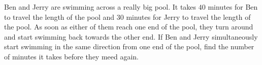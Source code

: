 Ben and Jerry are swimming across a really big pool. It takes $40$ minutes for Ben to travel the length of the pool and $30$ minutes for Jerry to travel the length of the pool. As soon as either of them reach one end of the pool, they turn around and start swimming back towards the other end. If Ben and Jerry simultaneously start swimming in the same direction from one end of the pool, find the number of minutes it takes before they meed again.
